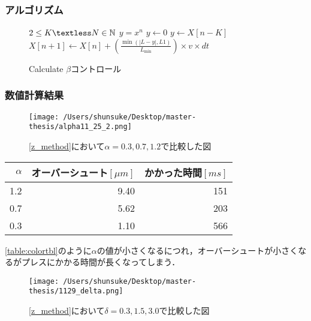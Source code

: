 \documentclass [dvipdfmx] {jsarticle}
\numberwithin{equation}{section}
\theoremstyle{definition} %
\theoremstyle{definition} %
\begin{document}
\subsubsection{アルゴリズム}
\begin{figure}[h]
    \begin{algorithm}[H]
        \caption{Calculate $\beta$コントロール}
        \label{alg1}
        \begin{algorithmic}[1]    
        \REQUIRE $2\le K \textless N\in\mathbb{N}$
        \ENSURE $y = x^n$
        \STATE $y \leftarrow 0$
        \ELSE
        \STATE $y \leftarrow X[n-K]$
        \ENDIF
        \STATE $X[n+1]\leftarrow X[n]+\left(\displaystyle\frac{\min(|L-y|,L1)}{L_{\min}}\right)\times v\times dt$
        \ENDFOR
        \end{algorithmic}
    \end{algorithm}
\end{figure}
\newpage
\subsubsection{数値計算結果}
\begin{figure}[h]
\begin{center}
\texttt{[image: /Users/shunsuke/Desktop/master-thesis/alpha11\_25\_2.png]}
\caption{\eqref{z_method}において$\alpha=0.3,0.7,1.2$で比較した図}
\end{center}
\end{figure}

\begin{table}[h]
    \label{table:colortbl}
    \centering
    \begin{tabular}{|r|r|r|}
     \hline
     $\alpha$ & オーバーシュート$[\mu m]$ & かかった時間$[ms]$  \\
     \hline\hline
     1.2 & 9.40 & 151 \\
     0.7 & 5.62 & 203 \\
     0.3 & 1.10 & 566\\
     \hline
    \end{tabular}
\end{table}
  
\eqref{table:colortbl}のように$\alpha$の値が小さくなるにつれ，オーバーシュートが小さくなるがプレスにかかる時間が長くなってしまう．


\begin{figure}[h]
    \begin{center}
    \texttt{[image: /Users/shunsuke/Desktop/master-thesis/1129\_delta.png]}
    \caption{\eqref{z_method}において$\delta=0.3,1.5,3.0$で比較した図}
    \end{center}
\end{figure}
\end{document}
